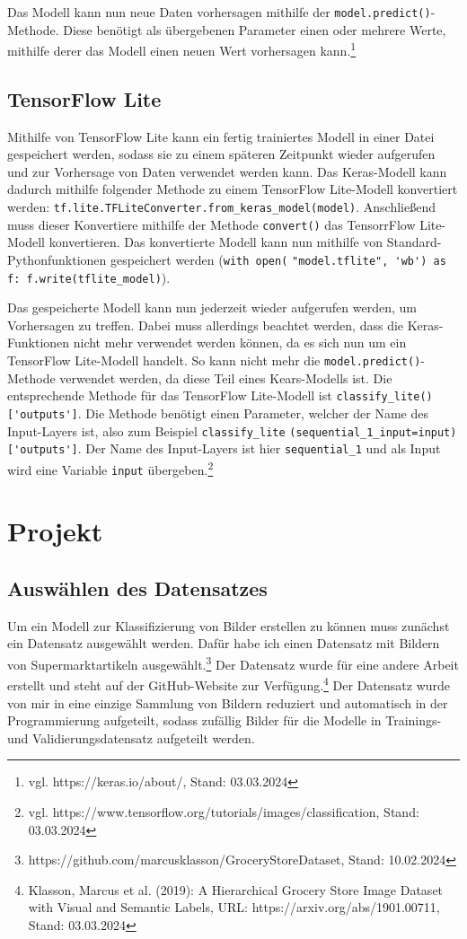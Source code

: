\documentclass[11pt,oneside]{report}
\begin{document}
Das Modell kann nun neue Daten vorhersagen mithilfe der \verb+model.predict()+-Methode. Diese benötigt als übergebenen Parameter einen oder mehrere Werte, mithilfe derer das Modell einen neuen Wert vorhersagen kann.\footnote{vgl. https://keras.io/about/, Stand: 03.03.2024}

\section{TensorFlow Lite}
Mithilfe von TensorFlow Lite kann ein fertig trainiertes Modell in einer Datei gespeichert werden, sodass sie zu einem späteren Zeitpunkt wieder aufgerufen und zur Vorhersage von Daten verwendet werden kann. Das Keras-Modell kann dadurch mithilfe folgender Methode zu einem TensorFlow Lite-Modell konvertiert werden: \verb+tf.lite.TFLiteConverter.from_keras_model(model)+. Anschließend muss dieser Konvertiere mithilfe der Methode \verb+convert()+ das TensorrFlow Lite-Modell konvertieren. Das konvertierte Modell kann nun mithilfe von Standard-Pythonfunktionen gespeichert werden (\verb+with open(+ \verb+"model.tflite", 'wb') as f: f.write(tflite_model)+).

Das gespeicherte Modell kann nun jederzeit wieder aufgerufen werden, um Vorhersagen zu treffen. Dabei muss allerdings beachtet werden, dass die Keras-Funktionen nicht mehr verwendet werden können, da es sich nun um ein TensorFlow Lite-Modell handelt. So kann nicht mehr die \verb+model.predict()+-Methode verwendet werden, da diese Teil eines Kears-Modells ist. Die entsprechende Methode für das TensorFlow Lite-Modell ist \verb+classify_lite()['outputs']+. Die Methode benötigt einen Parameter, welcher der Name des Input-Layers ist, also zum Beispiel \verb+classify_lite+ \verb+(sequential_1_input=input)['outputs']+. Der Name des Input-Layers ist hier \verb+sequential_1+ und als Input wird eine Variable \verb+input+ übergeben.\footnote{vgl. https://www.tensorflow.org/tutorials/images/classification, Stand: 03.03.2024}


\chapter{Projekt}

\section{Auswählen des Datensatzes}
Um ein Modell zur Klassifizierung von Bilder erstellen zu können muss zunächst ein Datensatz ausgewählt werden. Dafür habe ich einen Datensatz mit Bildern von Supermarktartikeln ausgewählt.\footnote{https://github.com/marcusklasson/GroceryStoreDataset, Stand: 10.02.2024} Der Datensatz wurde für eine andere Arbeit erstellt und steht auf der GitHub-Website zur Verfügung.\footnote{Klasson, Marcus et al. (2019): A Hierarchical Grocery Store Image Dataset with Visual and Semantic Labels, URL: https://arxiv.org/abs/1901.00711, Stand: 03.03.2024} Der Datensatz wurde von mir in eine einzige Sammlung von Bildern reduziert und automatisch in der Programmierung aufgeteilt, sodass zufällig Bilder für die Modelle in Trainings- und Validierungsdatensatz aufgeteilt werden.
\end{document}
